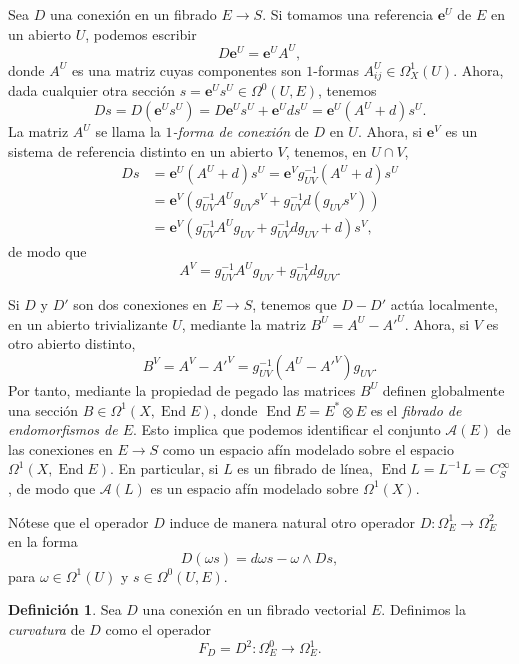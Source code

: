 \documentclass[12pt,a4paper]{article}
\theoremstyle{definition} \newtheorem{defn}[thm]{Definición}
\theoremstyle{definition} \newtheorem{ejemplo}[thm]{Ejemplo}
\theoremstyle{definition} \newtheorem{ejercicio}[thm]{Ejercicio}
\DeclareMathOperator{\End}{End}
\begin{document}
	  Sea $D$ una conexión en un fibrado $E\rightarrow S$. Si tomamos una referencia $\mathbf{e}^U$ de $E$ en un abierto $U$, podemos escribir
	  \begin{equation*}
	    D \mathbf{e}^U = \mathbf{e}^U A^U,
	  \end{equation*}
	  donde $A^U$ es una matriz cuyas componentes son $1$-formas $A^U_{ij} \in \Omega^1_X(U)$. Ahora, dada cualquier otra sección $s=\mathbf{e}^U s^U \in \Omega^0(U,E)$, tenemos
	  \begin{equation*}
	    D s = D(\mathbf{e}^U s^U) = D\mathbf{e}^U s^U + \mathbf{e}^U ds^U = \mathbf{e}^U (A^U + d) s^U.
	  \end{equation*}
	  La matriz $A^U$ se llama la \emph{$1$-forma de conexión} de $D$ en $U$. Ahora, si $\mathbf{e}^V$ es un sistema de referencia distinto en un abierto $V$, tenemos, en $U\cap V$,
	  \begin{align*}
	    Ds &= \mathbf{e}^U (A^U+d)s^U = \mathbf{e}^Vg_{UV}^{-1} (A^U+d) s^U \\ 
	    &= \mathbf{e}^V (g_{UV}^{-1} A^U g_{UV} s^V + g_{UV}^{-1}d(g_{UV} s^V)) \\
	    & = \mathbf{e}^V (g_{UV}^{-1} A^U g_{UV} + g_{UV}^{-1} dg_{UV} + d) s^V,
	  \end{align*}
	  de modo que
	  \begin{equation*}
	    A^V = g_{UV}^{-1} A^U g_{UV} + g_{UV}^{-1} dg_{UV}.
	  \end{equation*}

	  Si $D$ y $D'$ son dos conexiones en $E\rightarrow S$, tenemos que $D-D'$ actúa localmente, en un abierto trivializante $U$, mediante la matriz $B^U=A^U-A'^U$. Ahora, si $V$ es otro abierto distinto, 
	  \begin{equation*}
	   B^V= A^V-A'^V =g_{UV}^{-1} (A^U-A'^V) g_{UV} .
	  \end{equation*}
	  Por tanto, mediante la propiedad de pegado las matrices $B^U$ definen globalmente una sección $B \in \Omega^1(X,\End E)$, donde $\End E = E^* \otimes E$ es el \emph{fibrado de endomorfismos de $E$}. Esto implica que podemos identificar el conjunto $\mathcal{A}(E)$ de las conexiones en $E\rightarrow S$ como un espacio afín modelado sobre el espacio $\Omega^1(X,\End E)$. En particular, si $L$ es un fibrado de línea, $\End L = L^{-1} L = C^\infty_S$, de modo que $\mathcal{A}(L)$ es un espacio afín modelado sobre $\Omega^1(X)$.

	  Nótese que el operador $D$ induce de manera natural otro operador $D:\Omega^1_E \rightarrow \Omega^2_E$ en la forma
	  \begin{equation*}
	    D(\omega s) = d\omega s - \omega \wedge Ds,
	  \end{equation*}
	  para $\omega \in \Omega^1(U)$ y $s \in \Omega^0(U,E)$.
	  \begin{defn}
	    Sea $D$ una conexión en un fibrado vectorial $E$. Definimos la \emph{curvatura} de $D$ como el operador
	    \begin{equation*}
	     F_D=D^2: \Omega^0_E \rightarrow \Omega^1_E.
	    \end{equation*}
	  \end{defn}
\end{document}
